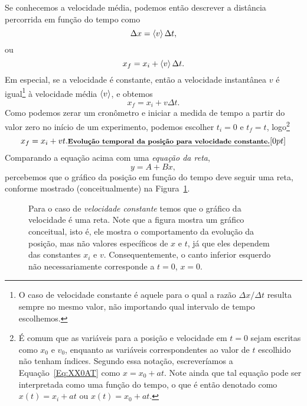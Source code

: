 Se conhecemos a velocidade média, podemos então descrever a distância percorrida em função do tempo como
\begin{equation}
  \Delta x = \left\langle{v}\right\rangle \Delta t,
\end{equation}
%
ou
\begin{equation}
    x_f = x_i + \left\langle{v}\right\rangle \Delta t.
\end{equation}
%
Em especial, se a velocidade é constante, então a velocidade instantânea $v$ é igual\footnote{O caso de velocidade constante é aquele para o qual a razão $\Delta x / \Delta t$ resulta sempre no mesmo valor, não importando qual intervalo de tempo escolhemos.} à velocidade média $\left\langle{v}\right\rangle$, e obtemos
\begin{equation}
    x_f = x_i + v \Delta t.
\end{equation}
%
Como podemos zerar um cronômetro e iniciar a medida de tempo a partir do valor zero no início de um experimento, podemos escolher $t_i = 0$ e $t_f = t$, logo\footnote[][10cm]{É comum que as variáveis para a posição e velocidade em $t = 0$ sejam escritas como $x_0$ e $v_0$, enquanto as variáveis correspondentes ao valor de $t$ escolhido não tenham índices. Segundo essa notação, escreveríamos a Equação~\eqref{Eq:XX0AT} como $x = x_0 + at$. Note ainda que tal equação pode ser interpretada como uma função do tempo, o que é então denotado como $x(t) = x_i + at$ ou $x(t) = x_0 + at$.}
\begin{equation}\label{Eq:XX0AT}
  x_f = x_i + vt.\relax{\footnotesize\emph{\textbf{Evolução temporal da posição para velocidade constante.}}}[0pt]
\end{equation}
%
Comparando a equação acima com uma \emph{equação da reta},
\begin{equation}
    y = A + Bx,
\end{equation}
%
percebemos que o gráfico da posição em função do tempo deve seguir uma reta, conforme mostrado (conceitualmente) na Figura~\ref{Fig:GraficoGenericoEvolPosicaoComoReta}.

\begin{figure}[!h]
\centering
{}
\caption{Para o caso de \emph{velocidade constante} temos que o gráfico da velocidade é uma reta. Note que a figura mostra um gráfico conceitual, isto é, ele mostra o comportamento da evolução da posição, mas não valores específicos de $x$ e $t$, já que eles dependem das constantes $x_i$ e $v$. Consequentemente, o canto inferior esquerdo não necessariamente corresponde a $t=0$, $x=0$. \label{Fig:GraficoGenericoEvolPosicaoComoReta}}
\end{figure}


